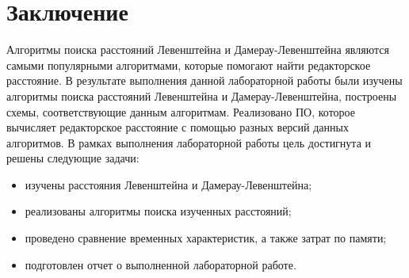 \chapter*{Заключение}

Алгоритмы поиска расстояний Левенштейна и Дамерау-Левенштейна являются самыми популярными алгоритмами, которые помогают найти редакторское расстояние.
В результате выполнения данной лабораторной работы были изучены алгоритмы поиска расстояний Левенштейна и Дамерау-Левенштейна, построены схемы, соответствующие данным алгоритмам. Реализовано ПО, которое вычисляет редакторское расстояние с помощью разных версий данных алгоритмов.
В рамках выполнения лабораторной работы цель достигнута и решены следующие задачи:
\begin{itemize}
	\item изучены расстояния Левенштейна и Дамерау-Левенштейна;
	\item реализованы алгоритмы поиска изученных расстояний;
	\item проведено сравнение временных характеристик, а также затрат по памяти;
	\item подготовлен отчет о выполненной лабораторной работе.
\end{itemize}


